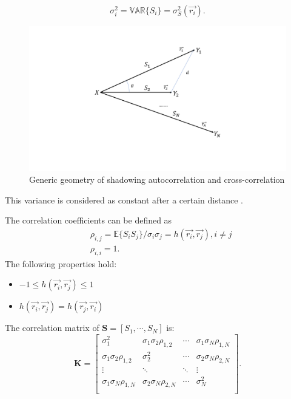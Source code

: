 \begin{equation}
\sigma_{i}^{2} = \mathbb{VAR}\{S_{i}\} = \sigma_{S}^2(\vec{r_{i}}).
\label{eq:1}
\end{equation}
\begin{figure} 
\centering
\includegraphics[width=14cm]{FadingGeometry.pdf}
\caption{Generic geometry of shadowing autocorrelation and cross-correlation}
\label{fig:2}
\end{figure}
This variance is considered as constant after a certain distance \cite{kitchener2006correlated}.
\par The correlation coefficients can be defined as
\begin{equation}
\begin{split}
& \rho_{i,j} = \mathbb{E}\{S_{i}S_{j}\}/\sigma_{i}\sigma_{j} = h(\vec{r_{i}}, \vec{r_{j}}), i \neq j \\
& \rho_{i,i} = 1.
\end{split}
\label{eq:2}
\end{equation}
The following properties hold:
\begin{itemize} 
\item $-1\leq h(\vec{r_{i}}, \vec{r_{j}}) \leq 1$
\item $h(\vec{r_{i}}, \vec{r_{j}})  = h(\vec{r_{j}}, \vec{r_{i}}) $
\end{itemize}
The correlation matrix of $\mathbf{S} = [S_{1}, \cdots, S_{N}]$ is:
\begin{equation}
\mathbf{K} = \left[\begin{array}{cccc}
\sigma_{1}^{2} & \sigma_{1}\sigma_{2}\rho_{1,2} & \cdots & \sigma_{1}\sigma_{N}\rho_{1,N}\\
\sigma_{1}\sigma_{2}\rho_{1,2} & \sigma_{2}^{2} & \cdots & \sigma_{2}\sigma_{N}\rho_{2,N}\\
\vdots & \ddots & \ddots & \vdots\\
\sigma_{1}\sigma_{N}\rho_{1,N} & \sigma_{2}\sigma_{N}\rho_{2,N} & \cdots & \sigma_{N}^2\\
\end{array}\right].
\label{eq:3}
\end{equation}
